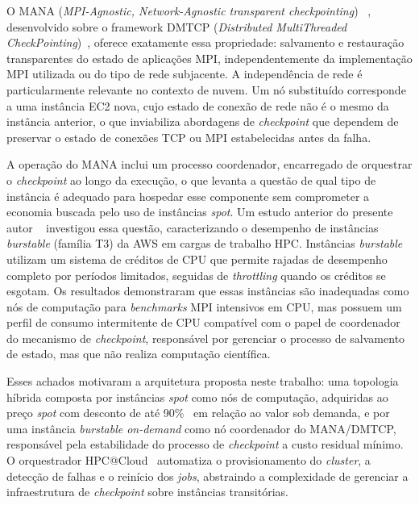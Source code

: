 O MANA (\textit{MPI-Agnostic, Network-Agnostic transparent checkpointing})%
~\cite{garg2019mana,arya2016split}, desenvolvido sobre o framework DMTCP
(\textit{Distributed MultiThreaded CheckPointing})~\cite{ansel2009dmtcp}, oferece
exatamente essa propriedade: salvamento e restauração transparentes do estado de
aplicações MPI, independentemente da implementação MPI utilizada ou do tipo de rede
subjacente. A independência de rede é particularmente relevante no contexto de nuvem.
Um nó substituído corresponde a uma instância EC2 nova, cujo estado de conexão de
rede não é o mesmo da instância anterior, o que inviabiliza abordagens de
\textit{checkpoint} que dependem de preservar o estado de conexões TCP ou MPI
estabelecidas antes da falha.

A operação do MANA inclui um processo coordenador, encarregado de orquestrar o
\textit{checkpoint} ao longo da execução, o que levanta a questão de qual tipo de
instância é adequado para hospedar esse componente sem comprometer a economia buscada
pelo uso de instâncias \textit{spot}. Um estudo anterior do presente autor%
~\cite{soda2025erad,soda2025wcc} investigou essa questão, caracterizando o desempenho
de instâncias \textit{burstable} (família T3) da AWS em cargas de trabalho HPC.
Instâncias \textit{burstable} utilizam um sistema de créditos de CPU que permite
rajadas de desempenho completo por períodos limitados, seguidas de \textit{throttling}
quando os créditos se esgotam. Os resultados demonstraram que essas instâncias são
inadequadas como nós de computação para \textit{benchmarks} MPI intensivos em CPU, mas possuem
um perfil de consumo intermitente de CPU compatível com o papel de coordenador do
mecanismo de \textit{checkpoint}, responsável por gerenciar o processo de salvamento
de estado, mas que não realiza computação científica.

Esses achados motivaram a arquitetura proposta neste trabalho: uma topologia híbrida
composta por instâncias \textit{spot} como nós de computação, adquiridas ao preço
\textit{spot} com desconto de até 90\%~\cite{aws2018spot} em relação ao valor sob
demanda, e por uma instância \textit{burstable on-demand} como nó coordenador do
MANA/DMTCP, responsável pela estabilidade do processo de \textit{checkpoint} a custo
residual mínimo. O orquestrador HPC@Cloud~\cite{munhoz2024hpccloud} automatiza o provisionamento
do \textit{cluster}, a detecção de falhas e o reinício dos \textit{jobs}, abstraindo a
complexidade de gerenciar a infraestrutura de \textit{checkpoint} sobre instâncias
transitórias.

